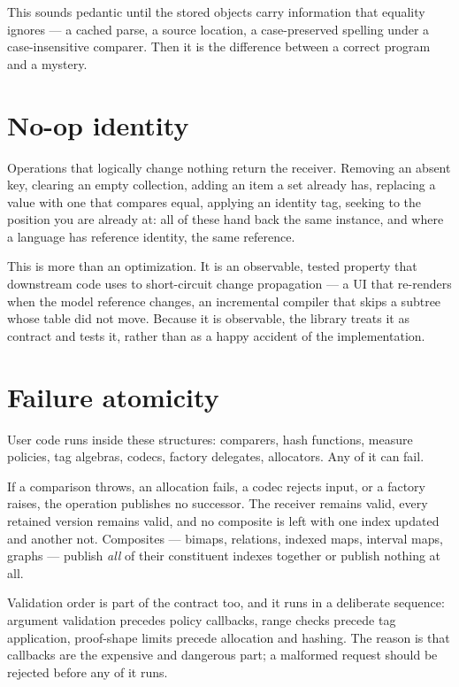 \documentclass[11pt,twoside,openright]{book}
\begin{document}
This sounds pedantic until the stored objects carry information that equality
ignores --- a cached parse, a source location, a case-preserved spelling under a
case-insensitive comparer. Then it is the difference between a correct program
and a mystery.

\section{No-op identity}

Operations that logically change nothing return the receiver. Removing an absent
key, clearing an empty collection, adding an item a set already has, replacing a
value with one that compares equal, applying an identity tag, seeking to the
position you are already at: all of these hand back the same instance, and where
a language has reference identity, the same reference.

This is more than an optimization. It is an observable, tested property that
downstream code uses to short-circuit change propagation --- a UI that re-renders
when the model reference changes, an incremental compiler that skips a
subtree whose table did not move. Because it is observable, the library treats it
as contract and tests it, rather than as a happy accident of the implementation.

\section{Failure atomicity}

User code runs inside these structures: comparers, hash functions, measure
policies, tag algebras, codecs, factory delegates, allocators. Any of it can
fail.

\begin{contractbox}
If a comparison throws, an allocation fails, a codec rejects input, or a factory
raises, the operation publishes no successor. The receiver remains valid, every
retained version remains valid, and no composite is left with one index updated
and another not. Composites --- bimaps, relations, indexed maps, interval maps,
graphs --- publish \emph{all} of their constituent indexes together or publish
nothing at all.
\end{contractbox}

Validation order is part of the contract too, and it runs in a deliberate
sequence: argument validation precedes policy callbacks, range checks precede tag
application, proof-shape limits precede allocation and hashing. The reason is
that callbacks are the expensive and dangerous part; a malformed request should
be rejected before any of it runs.
\end{document}
